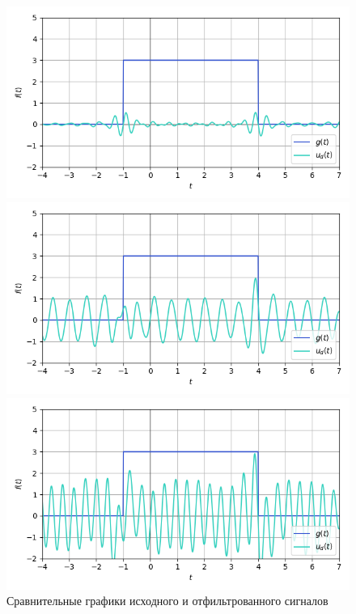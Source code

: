 \documentclass[a4paper]{article}
\begin{document}
\begin{figure}[H]
    \begin{minipage}{0.33\textwidth}
        \centering \includegraphics[width=\textwidth]{sources/high-pass filter/denoised (b=0, c=0.8, d=8, v=11).png}
        \caption{$b = 0, c = 0.8, d = 8, v = 11$}
    \end{minipage}\hfill
    \begin{minipage}{0.33\textwidth}
        \centering \includegraphics[width=\textwidth]{sources/high-pass filter/denoised (b=1, c=1, d=10, v=6).png}
        \caption{$b = 1, c = 1, d = 10, v = 6$}
    \end{minipage}\hfill
    \begin{minipage}{0.33\textwidth}
        \centering \includegraphics[width=\textwidth]{sources/high-pass filter/denoised (b=2, c=1.5, d=15, v=3).png}
        \caption{$b = 2, c = 1.5, d = 15, v = 3$}
    \end{minipage}
    \caption*{Сравнительные графики исходного и отфильтрованного сигналов}
\end{figure}
\end{document}
